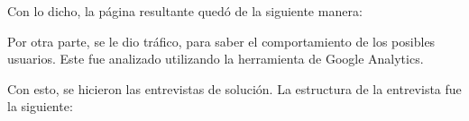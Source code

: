 Con lo dicho, la página resultante quedó de la siguiente manera:


Por otra parte, se le dio tráfico, para saber el comportamiento de los posibles usuarios. Este fue analizado utilizando la herramienta de Google Analytics.


Con esto, se hicieron las entrevistas de solución. La estructura de la entrevista fue la siguiente:

